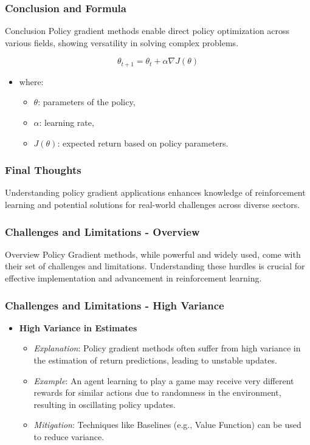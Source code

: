 \documentclass[aspectratio=169]{beamer}
\begin{document}
\begin{frame}[fragile]
    \frametitle{Conclusion and Formula}
    \begin{block}{Conclusion}
        Policy gradient methods enable direct policy optimization across various fields, showing versatility in solving complex problems.
    \end{block}
    
    \begin{equation}
        \theta_{t+1} = \theta_t + \alpha \nabla J(\theta)
    \end{equation}
    \begin{itemize}
        \item where:
        \begin{itemize}
            \item $\theta$: parameters of the policy,
            \item $\alpha$: learning rate,
            \item $J(\theta)$: expected return based on policy parameters.
        \end{itemize}
    \end{itemize}
\end{frame}

\begin{frame}[fragile]
    \frametitle{Final Thoughts}
    Understanding policy gradient applications enhances knowledge of reinforcement learning and potential solutions for real-world challenges across diverse sectors.
\end{frame}

\begin{frame}[fragile]
    \frametitle{Challenges and Limitations - Overview}
    \begin{block}{Overview}
        Policy Gradient methods, while powerful and widely used, come with their set of challenges and limitations. Understanding these hurdles is crucial for effective implementation and advancement in reinforcement learning.
    \end{block}
\end{frame}

\begin{frame}[fragile]
    \frametitle{Challenges and Limitations - High Variance}
    \begin{itemize}
        \item \textbf{High Variance in Estimates}
            \begin{itemize}
                \item \textit{Explanation}: Policy gradient methods often suffer from high variance in the estimation of return predictions, leading to unstable updates.
                \item \textit{Example}: An agent learning to play a game may receive very different rewards for similar actions due to randomness in the environment, resulting in oscillating policy updates.
                \item \textit{Mitigation}: Techniques like Baselines (e.g., Value Function) can be used to reduce variance.
            \end{itemize}
    \end{itemize}
\end{frame}
\end{document}
